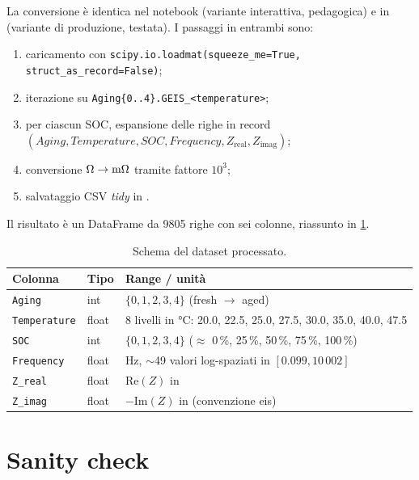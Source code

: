 La conversione è identica nel notebook
 (variante interattiva,
pedagogica) e in 
(variante di produzione, testata). I passaggi in entrambi sono:
\begin{enumerate}[leftmargin=*]
  \item caricamento con \texttt{scipy.io.loadmat(squeeze\_me=True,
        struct\_as\_record=False)};
  \item iterazione su \texttt{Aging\{0..4\}.GEIS\_<temperature>};
  \item per ciascun SOC, espansione delle righe in record
        $(Aging, Temperature, SOC, Frequency, Z_\text{real}, Z_\text{imag})$;
  \item conversione $\Omega \to \si{\milli\ohm}{}$ tramite fattore $10^3$;
  \item salvataggio CSV \emph{tidy} in
        .
\end{enumerate}

Il risultato è un DataFrame da \num{9805} righe con sei colonne, riassunto
in \cref{tab:dataset-schema}.

\begin{table}[H]
  \centering
  \caption{Schema del dataset processato.}
  \label{tab:dataset-schema}
  \begin{tabular}{lll}
    \toprule
    \textbf{Colonna} & \textbf{Tipo} & \textbf{Range / unità} \\
    \midrule
    \texttt{Aging}        & int   & $\{0, 1, 2, 3, 4\}$ (fresh $\to$ aged) \\
    \texttt{Temperature}  & float & 8 livelli in \si{\celsius}: 20.0, 22.5, 25.0, 27.5, 30.0, 35.0, 40.0, 47.5 \\
    \texttt{SOC}          & int   & $\{0, 1, 2, 3, 4\}$ ($\approx$ 0\,\%, 25\,\%, 50\,\%, 75\,\%, 100\,\%) \\
    \texttt{Frequency}    & float & \si{\hertz}, $\sim$49 valori log-spaziati in $[0.099, 10\,002]$ \\
    \texttt{Z\_real}      & float & $\mathrm{Re}(Z)$ in \milliohm{} \\
    \texttt{Z\_imag}      & float & $-\mathrm{Im}(Z)$ in \milliohm{} (convenzione \acrshort{eis}) \\
    \bottomrule
  \end{tabular}
\end{table}

\section{Sanity check}

